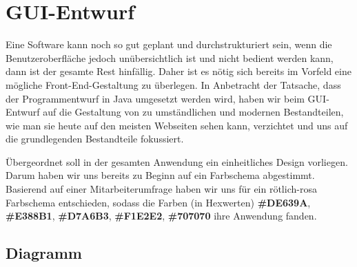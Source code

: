 \chapter{GUI-Entwurf}
\label{chapter:gui}

Eine Software kann noch so gut geplant und durchstrukturiert sein, wenn die Benutzeroberfläche jedoch unübersichtlich ist und nicht bedient werden kann, dann ist der gesamte Rest hinfällig. Daher ist es nötig sich bereits im Vorfeld eine mögliche Front-End-Gestaltung zu überlegen. In Anbetracht der Tatsache, dass der Programmentwurf in Java umgesetzt werden wird, haben wir beim GUI-Entwurf auf die Gestaltung von zu umständlichen und modernen Bestandteilen, wie man sie heute auf den meisten Webseiten sehen kann, verzichtet und uns auf die grundlegenden Bestandteile fokussiert. 


Übergeordnet soll in der gesamten Anwendung ein einheitliches Design vorliegen. Darum haben wir uns bereits zu Beginn auf ein Farbschema abgestimmt. Basierend auf einer Mitarbeiterumfrage haben wir uns für ein rötlich-rosa Farbschema entschieden, sodass die Farben (in Hexwerten) \textbf{\#DE639A}, \textbf{\#E388B1}, \textbf{\#D7A6B3}, \textbf{\#F1E2E2}, \textbf{\#707070} ihre Anwendung fanden. 

\newpage

\section{Diagramm}

